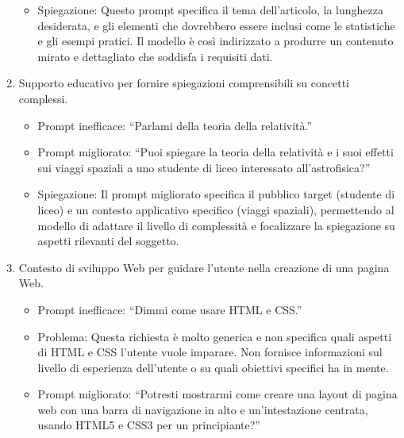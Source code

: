 \begin{enumerate}
\begin{itemize}
                    \item Spiegazione: Questo prompt specifica il tema dell'articolo, la lunghezza desiderata, e gli elementi che dovrebbero essere inclusi come le statistiche e gli esempi pratici. Il modello è così indirizzato a produrre un contenuto mirato e dettagliato che soddisfa i requisiti dati.
                \end{itemize}

                \item Supporto educativo per fornire spiegazioni comprensibili su concetti complessi.
                \begin{itemize}
                    \item Prompt inefficace: ``Parlami della teoria della relatività.''
                    
                    \item Prompt migliorato: ``Puoi spiegare la teoria della relatività e i suoi effetti sui viaggi spaziali a uno studente di liceo interessato all'astrofisica?''
                    
                    \item Spiegazione: Il prompt migliorato specifica il pubblico target (studente di liceo) e un contesto applicativo specifico (viaggi spaziali), permettendo al modello di adattare il livello di complessità e focalizzare la spiegazione su aspetti rilevanti del soggetto.
                \end{itemize}

                \item Contesto di sviluppo Web per guidare l'utente nella creazione di una pagina Web.
                \begin{itemize}
                    \item Prompt inefficace: ``Dimmi come usare HTML e CSS.''
                    
                    \item Problema: Questa richiesta è molto generica e non specifica quali aspetti di HTML e CSS l'utente vuole imparare. Non fornisce informazioni sul livello di esperienza dell'utente o su quali obiettivi specifici ha in mente.
                    
                    \item Prompt migliorato: ``Potresti mostrarmi come creare una layout di pagina web con una barra di navigazione in alto e un'intestazione centrata, usando HTML5 e CSS3 per un principiante?''
                    

\end{itemize}
\end{enumerate}
